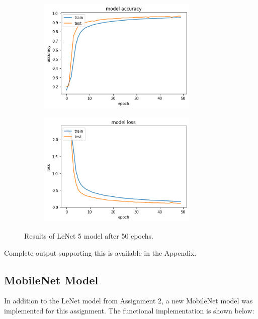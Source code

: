 \documentclass{article}
\begin{document}
\begin{figure}[H]
\centering
\begin{subfigure}
  \centering
  \includegraphics[width=3in]{csci-8920/hw-2/images/accuracy-50.png}
  \label{fig:accuracy-50}
\end{subfigure}%
\begin{subfigure}
  \centering
  \includegraphics[width=3in]{csci-8920/hw-2/images/loss-50.png}
  \label{fig:loss-50}
\end{subfigure}
\caption{Results of LeNet 5 model after 50 epochs.}
\label{fig:default-50}
\end{figure}

Complete output supporting this is available in the  Appendix.

\subsection{MobileNet Model}
In addition to the LeNet model from Assignment 2, a new MobileNet model was implemented for this assignment.
The functional implementation is shown below:
\end{document}
